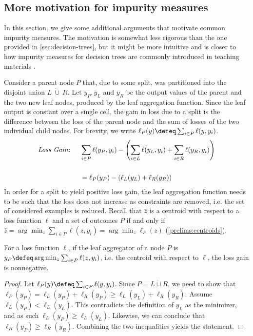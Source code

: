 \documentclass[
	twoside=false, %
]{kaobook}
\begin{document}
\subsection{More motivation for impurity measures}
\label{sec:splitting-criteria-greedily-minimise-loss-functions}

In this section, we give some additional arguments that motivate common impurity measures. The motivation is somewhat less rigorous than the one provided in \cref{sec:decision-trees}, but it might be more intuitive and is closer to how impurity measures for decision trees are commonly introduced in teaching materials \cite{tibshirani_ElementsStatisticalLearning_2017}.

Consider a parent node $P$ that, due to some split, was partitioned into the disjoint union $L~\dot{\cup}~R$.
Let $y_{P}, y_{L}$ and $y_{R}$ be the output values of the parent and the two new leaf nodes, produced by the leaf aggregation function. Since the leaf output is constant over a single cell, the gain in loss due to a split is the difference between the loss of the parent node and the sum of losses of the two individual child nodes.
For brevity, we write $\ell_{P}(y) \defeq \sum_{i \in P} \ell(y, y_{i})$.
\begin{align*}
\text{\textit{Loss Gain}: } \hspace{1em} &
\sum_{i \in P} \ell(y_{P}, y_{i}) - \left(  \sum_{i \in L} \ell(y_{L}, y_{i}) + \sum_{i \in R} \ell(y_{R}, y_{i}) \right) \\[1.5em]
&= \ell_P(y_P) - \left(\ell_L(y_L) + \ell_R(y_R) \right)
\end{align*}
In order for a split to yield positive loss gain, the leaf aggregation function needs to be such that the loss does not increase as constraints are removed, i.e. the set of considered examples is reduced. Recall that $\bar{z}$ is a centroid with respect to a loss function $\ell$ and a set of outcomes $P$ if and only if $\bar{z} = \arg\min_{z} \sum_{i \in P} \ell(z, y_{i}) = \arg\min_z \ell_P(z)$ (\ref{prelims:centroids}).
\begin{lemma}
\label{lemma:loss-gain-nonnegative}
For a loss function $\ell$, if the leaf aggregator of a node $P$ is $y_{P} \defeq \arg\min_{z} \sum_{i \in P} \ell(z, y_{i})$, i.e. the centroid with respect to $\ell$, the loss gain is nonnegative.
\end{lemma}
\begin{proof}
Let $\ell_{P}(y) \defeq \sum_{i \in P} \ell(y, y_{i})$. Since $P = L \dot{\cup}R$, we need to show that $\ell_{P}(y_{P}) = \ell_{L}(y_{P}) + \ell_{R}(y_{P}) \geq \ell_{L}(y_{L}) + \ell_{R}(y_{R})$. Assume $\ell_{L}(y_{P}) < \ell_{L}(y_{L})$. This contradicts the definition of $y_{L}$ as the minimizer, and as such $\ell_{L}(y_{P}) \geq \ell_{L}(y_{L})$. Likewise, we can conclude that $\ell_{R}(y_{P}) \geq \ell_{R}(y_{R})$. Combining the two inequalities yields the statement.
\end{proof}
\end{document}
